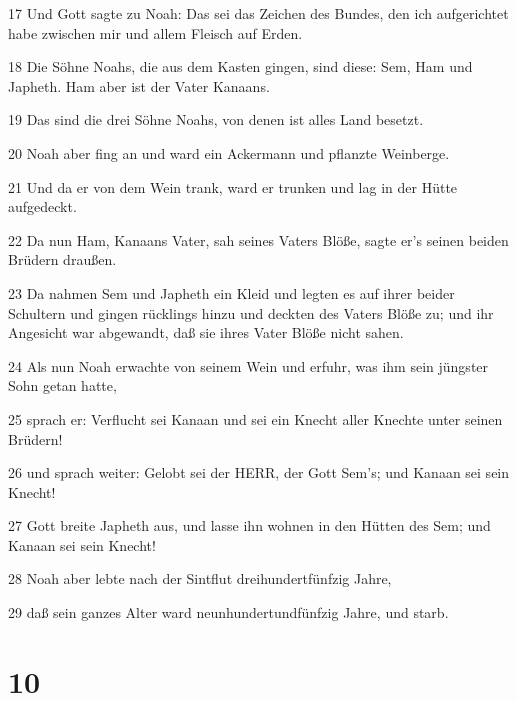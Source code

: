 \par 17 Und Gott sagte zu Noah: Das sei das Zeichen des Bundes, den ich aufgerichtet habe zwischen mir und allem Fleisch auf Erden.
\par 18 Die Söhne Noahs, die aus dem Kasten gingen, sind diese: Sem, Ham und Japheth. Ham aber ist der Vater Kanaans.
\par 19 Das sind die drei Söhne Noahs, von denen ist alles Land besetzt.
\par 20 Noah aber fing an und ward ein Ackermann und pflanzte Weinberge.
\par 21 Und da er von dem Wein trank, ward er trunken und lag in der Hütte aufgedeckt.
\par 22 Da nun Ham, Kanaans Vater, sah seines Vaters Blöße, sagte er's seinen beiden Brüdern draußen.
\par 23 Da nahmen Sem und Japheth ein Kleid und legten es auf ihrer beider Schultern und gingen rücklings hinzu und deckten des Vaters Blöße zu; und ihr Angesicht war abgewandt, daß sie ihres Vater Blöße nicht sahen.
\par 24 Als nun Noah erwachte von seinem Wein und erfuhr, was ihm sein jüngster Sohn getan hatte,
\par 25 sprach er: Verflucht sei Kanaan und sei ein Knecht aller Knechte unter seinen Brüdern!
\par 26 und sprach weiter: Gelobt sei der HERR, der Gott Sem's; und Kanaan sei sein Knecht!
\par 27 Gott breite Japheth aus, und lasse ihn wohnen in den Hütten des Sem; und Kanaan sei sein Knecht!
\par 28 Noah aber lebte nach der Sintflut dreihundertfünfzig Jahre,
\par 29 daß sein ganzes Alter ward neunhundertundfünfzig Jahre, und starb.

\chapter{10}

